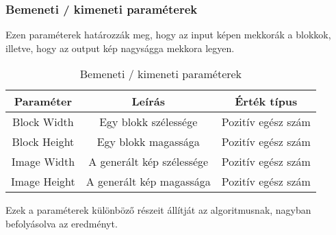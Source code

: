 \subsubsection{Bemeneti / kimeneti paraméterek}
Ezen paraméterek határozzák meg, hogy az input képen mekkorák a blokkok, illetve, hogy az output kép nagyságga mekkora legyen.
\begin{table}[H]
\caption{Bemeneti / kimeneti paraméterek}
\label{bemeneti-kimeneti-szabg}
\begin{center}
\begin{tabular}{ |c|c|c| } 
\hline
Paraméter & Leírás & Érték típus \\
 \hline\hline
 Block Width & Egy blokk szélessége & Pozitív egész szám \\ 
 \hline
 Block Height & Egy blokk magassága  & Pozitív egész szám\\ 
  \hline
  Image Width & A generált kép szélessége & Pozitív egész szám \\ 
 \hline
 Image Height & A generált kép magassága  & Pozitív egész szám\\ 
  \hline
\end{tabular}
\end{center}
\end{table}

Ezek a paraméterek különböző részeit állítját az algoritmusnak, nagyban befolyásolva az eredményt.

